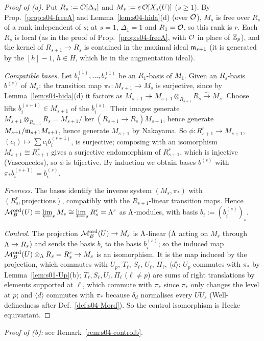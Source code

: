\begin{proof}[Proof of (a)]
Put $R_s:=\mathcal{O}[\Delta_s]$ and $M_s:=e\,\mathcal{O}[X_s(U)]$ ($s\ge1$). By Prop.~\ref{prop:s04-freeA} and Lemma~\ref{lem:s04-hida}(d) (over $\mathcal{O}$),
$M_s$ is free over $R_s$ of a rank independent of $s$; at $s=1$, $\Delta_1=1$ and $R_1=\mathcal{O}$, so this rank is $r$. Each $R_s$ is local
(as in the proof of Prop.~\ref{prop:s04-freeA}, with $\mathcal{O}$ in place of $\mathbb{Z}_p$), and the kernel of $R_{s+1}\to R_s$ is contained in
the maximal ideal $\mathfrak{m}_{s+1}$ (it is generated by the $[h]-1$, $h\in H$, which lie in the augmentation ideal).

\emph{Compatible bases.} Let $b^{(1)}_1,\dots,b^{(1)}_r$ be an $R_1$-basis of $M_1$. Given an $R_s$-basis $b^{(s)}$ of $M_s$: the
transition map $\pi_*:M_{s+1}\to M_s$ is surjective, since by Lemma~\ref{lem:s04-hida}(d) it factors as
$M_{s+1}\twoheadrightarrow M_{s+1}\otimes_{R_{s+1}}R_s\xrightarrow{\sim}M_s$. Choose lifts $b^{(s+1)}_i\in M_{s+1}$ of the $b^{(s)}_i$.
Their images generate $M_{s+1}\otimes_{R_{s+1}}R_s=M_{s+1}/\ker(R_{s+1}\to R_s)M_{s+1}$, hence generate $M_{s+1}/\mathfrak{m}_{s+1}M_{s+1}$, hence
generate $M_{s+1}$ by Nakayama. So $\phi:R_{s+1}^r\to M_{s+1}$, $(c_i)\mapsto\sum c_ib^{(s+1)}_i$, is surjective; composing with an
isomorphism $M_{s+1}\cong R_{s+1}^r$ gives a surjective endomorphism of $R_{s+1}^r$, which is injective (Vasconcelos), so $\phi$ is
bijective. By induction we obtain bases $b^{(s)}$ with $\pi_*b^{(s+1)}_i=b^{(s)}_i$.

\emph{Freeness.} The bases identify the inverse system $(M_s,\pi_*)$ with $(R_s^r,\text{projections})$, compatibly with the
$R_{s+1}$-linear transition maps. Hence $\mathcal{M}^{\mathrm{ord}}_B(U)=\varprojlim_sM_s\cong\varprojlim_sR_s^r=\Lambda^r$ as $\Lambda$-modules, with basis
$b_i:=(b^{(s)}_i)_s$.

\emph{Control.} The projection $\mathcal{M}^{\mathrm{ord}}_B(U)\to M_s$ is $\Lambda$-linear ($\Lambda$ acting on $M_s$ through $\Lambda\to R_s$) and sends the basis
$b_i$ to the basis $b^{(s)}_i$; so the induced map $\mathcal{M}^{\mathrm{ord}}_B(U)\otimes_\Lambda R_s=R_s^r\to M_s$ is an isomorphism. It is the map induced by
the projection, which commutes with $U_p$, $T_\ell$, $S_\ell$, $U_\ell$, $\Pi_\ell$, $\langle d\rangle$: $U_p$ commutes with $\pi_*$ by
Lemma~\ref{lem:s01-Up}(b); $T_\ell,S_\ell,U_\ell,\Pi_\ell$ ($\ell\ne p$) are sums of right translations by elements supported at $\ell$,
which commute with $\pi_*$ since $\pi_*$ only changes the level at $p$; and $\langle d\rangle$ commutes with $\pi_*$ because $\delta_d$
normalises every $UU_s$ (Well-definedness after Def.~\ref{def:s04-Mord}). So the control isomorphism is Hecke equivariant.
\end{proof}
\noindent\emph{Proof of (b):} see Remark~\ref{rem:s04-controlb}.

